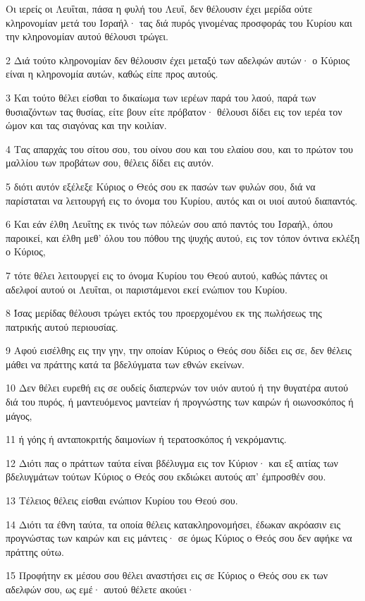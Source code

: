 \par Οι ιερείς οι Λευΐται, πάσα η φυλή του Λευΐ, δεν θέλουσιν έχει μερίδα ούτε κληρονομίαν μετά του Ισραήλ· τας διά πυρός γινομένας προσφοράς του Κυρίου και την κληρονομίαν αυτού θέλουσι τρώγει.
\par 2 Διά τούτο κληρονομίαν δεν θέλουσιν έχει μεταξύ των αδελφών αυτών· ο Κύριος είναι η κληρονομία αυτών, καθώς είπε προς αυτούς.
\par 3 Και τούτο θέλει είσθαι το δικαίωμα των ιερέων παρά του λαού, παρά των θυσιαζόντων τας θυσίας, είτε βουν είτε πρόβατον· θέλουσι δίδει εις τον ιερέα τον ώμον και τας σιαγόνας και την κοιλίαν.
\par 4 Τας απαρχάς του σίτου σου, του οίνου σου και του ελαίου σου, και το πρώτον του μαλλίου των προβάτων σου, θέλεις δίδει εις αυτόν.
\par 5 διότι αυτόν εξέλεξε Κύριος ο Θεός σου εκ πασών των φυλών σου, διά να παρίσταται να λειτουργή εις το όνομα του Κυρίου, αυτός και οι υιοί αυτού διαπαντός.
\par 6 Και εάν έλθη Λευΐτης εκ τινός των πόλεών σου από παντός του Ισραήλ, όπου παροικεί, και έλθη μεθ' όλου του πόθου της ψυχής αυτού, εις τον τόπον όντινα εκλέξη ο Κύριος,
\par 7 τότε θέλει λειτουργεί εις το όνομα Κυρίου του Θεού αυτού, καθώς πάντες οι αδελφοί αυτού οι Λευΐται, οι παριστάμενοι εκεί ενώπιον του Κυρίου.
\par 8 Ίσας μερίδας θέλουσι τρώγει εκτός του προερχομένου εκ της πωλήσεως της πατρικής αυτού περιουσίας.
\par 9 Αφού εισέλθης εις την γην, την οποίαν Κύριος ο Θεός σου δίδει εις σε, δεν θέλεις μάθει να πράττης κατά τα βδελύγματα των εθνών εκείνων.
\par 10 Δεν θέλει ευρεθή εις σε ουδείς διαπερνών τον υιόν αυτού ή την θυγατέρα αυτού διά του πυρός, ή μαντευόμενος μαντείαν ή προγνώστης των καιρών ή οιωνοσκόπος ή μάγος,
\par 11 ή γόης ή ανταποκριτής δαιμονίων ή τερατοσκόπος ή νεκρόμαντις.
\par 12 Διότι πας ο πράττων ταύτα είναι βδέλυγμα εις τον Κύριον· και εξ αιτίας των βδελυγμάτων τούτων Κύριος ο Θεός σου εκδιώκει αυτούς απ' έμπροσθέν σου.
\par 13 Τέλειος θέλεις είσθαι ενώπιον Κυρίου του Θεού σου.
\par 14 Διότι τα έθνη ταύτα, τα οποία θέλεις κατακληρονομήσει, έδωκαν ακρόασιν εις προγνώστας των καιρών και εις μάντεις· σε όμως Κύριος ο Θεός σου δεν αφήκε να πράττης ούτω.
\par 15 Προφήτην εκ μέσου σου θέλει αναστήσει εις σε Κύριος ο Θεός σου εκ των αδελφών σου, ως εμέ· αυτού θέλετε ακούει·
